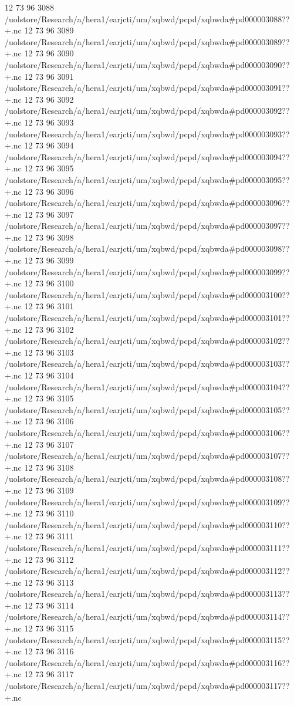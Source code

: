 12 73 96
3088
/uolstore/Research/a/hera1/earjcti/um/xqbwd/pcpd/xqbwda#pd000003088??+.nc
12 73 96
3089
/uolstore/Research/a/hera1/earjcti/um/xqbwd/pcpd/xqbwda#pd000003089??+.nc
12 73 96
3090
/uolstore/Research/a/hera1/earjcti/um/xqbwd/pcpd/xqbwda#pd000003090??+.nc
12 73 96
3091
/uolstore/Research/a/hera1/earjcti/um/xqbwd/pcpd/xqbwda#pd000003091??+.nc
12 73 96
3092
/uolstore/Research/a/hera1/earjcti/um/xqbwd/pcpd/xqbwda#pd000003092??+.nc
12 73 96
3093
/uolstore/Research/a/hera1/earjcti/um/xqbwd/pcpd/xqbwda#pd000003093??+.nc
12 73 96
3094
/uolstore/Research/a/hera1/earjcti/um/xqbwd/pcpd/xqbwda#pd000003094??+.nc
12 73 96
3095
/uolstore/Research/a/hera1/earjcti/um/xqbwd/pcpd/xqbwda#pd000003095??+.nc
12 73 96
3096
/uolstore/Research/a/hera1/earjcti/um/xqbwd/pcpd/xqbwda#pd000003096??+.nc
12 73 96
3097
/uolstore/Research/a/hera1/earjcti/um/xqbwd/pcpd/xqbwda#pd000003097??+.nc
12 73 96
3098
/uolstore/Research/a/hera1/earjcti/um/xqbwd/pcpd/xqbwda#pd000003098??+.nc
12 73 96
3099
/uolstore/Research/a/hera1/earjcti/um/xqbwd/pcpd/xqbwda#pd000003099??+.nc
12 73 96
3100
/uolstore/Research/a/hera1/earjcti/um/xqbwd/pcpd/xqbwda#pd000003100??+.nc
12 73 96
3101
/uolstore/Research/a/hera1/earjcti/um/xqbwd/pcpd/xqbwda#pd000003101??+.nc
12 73 96
3102
/uolstore/Research/a/hera1/earjcti/um/xqbwd/pcpd/xqbwda#pd000003102??+.nc
12 73 96
3103
/uolstore/Research/a/hera1/earjcti/um/xqbwd/pcpd/xqbwda#pd000003103??+.nc
12 73 96
3104
/uolstore/Research/a/hera1/earjcti/um/xqbwd/pcpd/xqbwda#pd000003104??+.nc
12 73 96
3105
/uolstore/Research/a/hera1/earjcti/um/xqbwd/pcpd/xqbwda#pd000003105??+.nc
12 73 96
3106
/uolstore/Research/a/hera1/earjcti/um/xqbwd/pcpd/xqbwda#pd000003106??+.nc
12 73 96
3107
/uolstore/Research/a/hera1/earjcti/um/xqbwd/pcpd/xqbwda#pd000003107??+.nc
12 73 96
3108
/uolstore/Research/a/hera1/earjcti/um/xqbwd/pcpd/xqbwda#pd000003108??+.nc
12 73 96
3109
/uolstore/Research/a/hera1/earjcti/um/xqbwd/pcpd/xqbwda#pd000003109??+.nc
12 73 96
3110
/uolstore/Research/a/hera1/earjcti/um/xqbwd/pcpd/xqbwda#pd000003110??+.nc
12 73 96
3111
/uolstore/Research/a/hera1/earjcti/um/xqbwd/pcpd/xqbwda#pd000003111??+.nc
12 73 96
3112
/uolstore/Research/a/hera1/earjcti/um/xqbwd/pcpd/xqbwda#pd000003112??+.nc
12 73 96
3113
/uolstore/Research/a/hera1/earjcti/um/xqbwd/pcpd/xqbwda#pd000003113??+.nc
12 73 96
3114
/uolstore/Research/a/hera1/earjcti/um/xqbwd/pcpd/xqbwda#pd000003114??+.nc
12 73 96
3115
/uolstore/Research/a/hera1/earjcti/um/xqbwd/pcpd/xqbwda#pd000003115??+.nc
12 73 96
3116
/uolstore/Research/a/hera1/earjcti/um/xqbwd/pcpd/xqbwda#pd000003116??+.nc
12 73 96
3117
/uolstore/Research/a/hera1/earjcti/um/xqbwd/pcpd/xqbwda#pd000003117??+.nc
